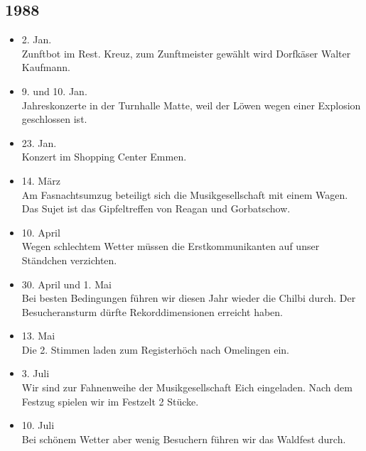 \subsection*{1988}

\begin{history}


    \begin{itemize}

        \item 2. Jan.\\
              Zunftbot im Rest. Kreuz, zum Zunftmeister gewählt wird Dorfkäser Walter
              Kaufmann.

        \item 9. und 10. Jan.\\
              Jahreskonzerte in der Turnhalle Matte, weil der Löwen wegen einer
              Explosion geschlossen ist.

        \item 23. Jan.\\
              Konzert im Shopping Center Emmen.

        \item 14. März\\
              Am Fasnachtsumzug beteiligt sich die Musikgesellschaft mit einem Wagen.
              Das Sujet ist das Gipfeltreffen von Reagan und Gorbatschow.

        \item 10. April\\
              Wegen schlechtem Wetter müssen die Erstkommunikanten auf unser Ständchen
              verzichten.

        \item 30. April und 1. Mai\\
              Bei besten Bedingungen führen wir diesen Jahr wieder die Chilbi durch.
              Der Besucheransturm dürfte Rekorddimensionen erreicht haben.

        \item 13. Mai\\
              Die 2. Stimmen laden zum Registerhöch nach Omelingen ein.

        \item 3. Juli\\
              Wir sind zur Fahnenweihe der Musikgesellschaft Eich eingeladen. Nach dem
              Festzug spielen wir im Festzelt 2 Stücke.

        \item 10. Juli\\
              Bei schönem Wetter aber wenig Besuchern führen wir das Waldfest durch.


\end{itemize}
\end{history}
